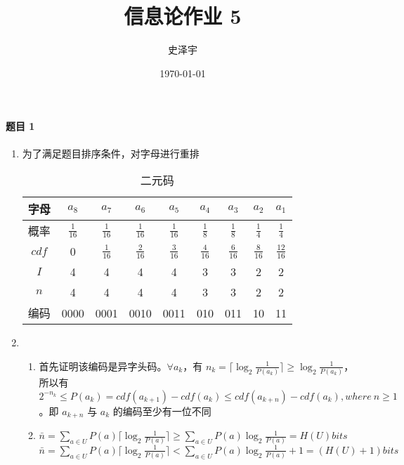\documentclass{ctexart}
\title{信息论作业 5}
\author{史泽宇}
\date{\today}
\begin{document}
\maketitle

\paragraph{题目 1}

\begin{enumerate}
    \item 为了满足题目排序条件，对字母进行重排
    \begin{table}[H]
        \centering
        \caption{二元码}
        \begin{tabular}{ccccccccc}
            \hline
            字母 & $a_8$ & $a_7$ & $a_6$ & $a_5$ & $a_4$ & $a_3$ & $a_2$ & $a_1$ \\
            \hline
            概率 & $\frac{1}{16}$ & $\frac{1}{16}$ & $\frac{1}{16}$ & $\frac{1}{16}$ & $\frac{1}{8}$ & $\frac{1}{8}$ & $\frac{1}{4}$ & $\frac{1}{4}$ \\
            $cdf$ & 0 & $\frac{1}{16}$ & $\frac{2}{16}$ & $\frac{3}{16}$ & $\frac{4}{16}$ & $\frac{6}{16}$ & $\frac{8}{16}$ & $\frac{12}{16}$ \\
            $I$ & 4 & 4 & 4 & 4 & 3 & 3 & 2 & 2 \\
            $n$ & 4 & 4 & 4 & 4 & 3 & 3 & 2 & 2 \\
            编码 & 0000 & 0001 & 0010 & 0011 & 010 & 011 & 10 & 11 \\
            \hline
        \end{tabular}
    \end{table}
    \item\begin{enumerate}
        \item 首先证明该编码是异字头码。$\forall a_k$，有 $n_k = \lceil \log_2\frac{1}{P(a_k)} \rceil \geq \log_2\frac{1}{P(a_k)}$，所以有 $2^{-n_k} \leq P(a_k) = cdf(a_{k+1}) - cdf(a_k) \leq cdf(a_{k+n}) - cdf(a_k), where\ n \geq 1$。即 $a_{k+n}$ 与 $a_k$ 的编码至少有一位不同
        \item $\bar{n} = \sum_{a \in U} P(a)\lceil\log_2\frac{1}{P(a)}\rceil \geq \sum_{a \in U} P(a)\log_2\frac{1}{P(a)} = H(U) bits$ \\
        $\bar{n} = \sum_{a \in U} P(a)\lceil\log_2\frac{1}{P(a)}\rceil < \sum_{a \in U} P(a)\log_2\frac{1}{P(a)} + 1 = (H(U) + 1) bits$
    \end{enumerate}
\end{enumerate}
\end{document}
